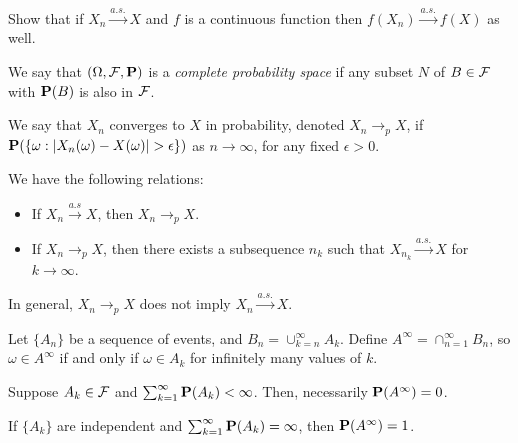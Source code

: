 \begin{exercise*}
Show that if $X_n \xrightarrow{a.s.} X$ and $f$ is a continuous function then
$f(X_n) \xrightarrow{a.s.} f(X)$ as well.
\end{exercise*}

\begin{definition*} 
We say that $(\Omega, \mathcal{F}, \mathbf{P})$ is a \emph{complete probability space} if any
subset $N$ of $B \in \mathcal{F}$ with $\mathbf{P}(B)$ is also in $\mathcal{F}$.
\end{definition*} 

\begin{definition*} 
We say that $X_n$ converges to $X$ in probability, denoted $X_n \rightarrow_p
X$, if $\mathbf{P}(\{\omega: |X_n(\omega) - X(\omega)| > \epsilon\})$ as $n\rightarrow
\infty$, for any fixed $\epsilon > 0$.
\end{definition*} 

\begin{theorem*} 
We have the following relations:
\begin{itemize}
\item If $X_n \xrightarrow{a.s} X$, then $X_n \rightarrow_p X$.
\item If $X_n \rightarrow_p X$, then there exists a subsequence $n_k$ such that
$X_{n_k} \xrightarrow{a.s.} X$ for $k \rightarrow \infty$.
\end{itemize}
\end{theorem*} 

\begin{proposition*} 
In general, $X_n \rightarrow_p X$ does not imply $X_n \xrightarrow{a.s.} X$.
\end{proposition*} 

\begin{definition*} 
Let $\{A_n\}$ be a sequence of events, and $B_n = \cup_{k=n}^\infty A_k$. Define
$A^\infty = \cap_{n=1}^\infty B_n$, so $\omega \in A^\infty$ if and only if
$\omega \in A_k$ for infinitely many values of $k$.
\end{definition*} 

\begin{lemma*}
Suppose $A_k \in \mathcal{F}$ and $\sum_{k=1}^\infty \mathbf{P}(A_k) < \infty$. Then,
necessarily $\mathbf{P}(A^\infty) = 0$.
\end{lemma*} 

\begin{lemma*}
If $\{A_k\}$ are independent and $\sum_{k=1}^\infty \mathbf{P}(A_k) = \infty$, then
$\mathbf{P}(A^\infty) = 1$.
\end{lemma*} 

